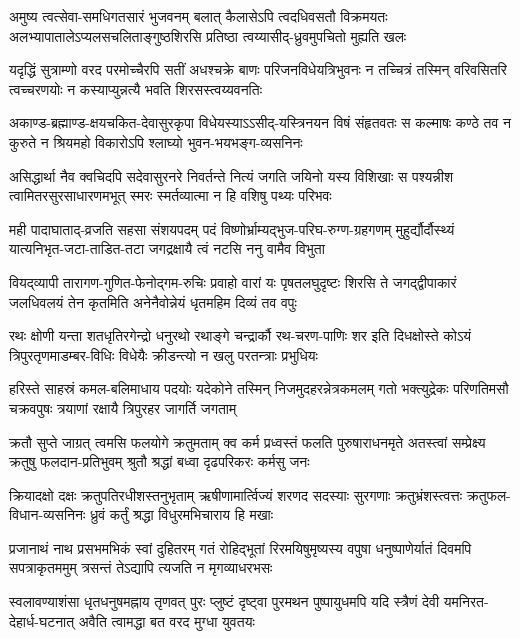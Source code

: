 \fourlineindentedshloka
{अमुष्य त्वत्सेवा-समधिगतसारं भुजवनम्}
{बलात् कैलासेऽपि त्वदधिवसतौ विक्रमयतः}
{अलभ्यापातालेऽप्यलसचलिताङ्गुष्ठशिरसि}
{प्रतिष्ठा त्वय्यासीद्-ध्रुवमुपचितो मुह्यति खलः}

\fourlineindentedshloka
{यदृद्धिं सुत्राम्णो वरद परमोच्चैरपि सतीं}
{अधश्चक्रे बाणः परिजनविधेयत्रिभुवनः}
{न तच्चित्रं तस्मिन् वरिवसितरि त्वच्चरणयोः}
{न कस्याप्युन्नत्यै भवति शिरसस्त्वय्यवनतिः}

\fourlineindentedshloka
{अकाण्ड-ब्रह्माण्ड-क्षयचकित-देवासुरकृपा}
{विधेयस्याऽऽसीद्-यस्त्रिनयन विषं संहृतवतः}
{स कल्माषः कण्ठे तव न कुरुते न श्रियमहो}
{विकारोऽपि श्लाघ्यो भुवन-भयभङ्ग-व्यसनिनः}

\fourlineindentedshloka
{असिद्धार्था नैव क्वचिदपि सदेवासुरनरे}
{निवर्तन्ते नित्यं जगति जयिनो यस्य विशिखाः}
{स पश्यन्नीश त्वामितरसुरसाधारणमभूत्}
{स्मरः स्मर्तव्यात्मा न हि वशिषु पथ्यः परिभवः}

\fourlineindentedshloka
{मही पादाघाताद्-व्रजति सहसा संशयपदम्}
{पदं विष्णोर्भ्राम्यद्भुज-परिघ-रुग्ण-ग्रहगणम्}
{मुहुर्द्यौर्दौस्थ्यं यात्यनिभृत-जटा-ताडित-तटा}
{जगद्रक्षायै त्वं नटसि ननु वामैव विभुता}

\fourlineindentedshloka
{वियद्‍व्यापी तारागण-गुणित-फेनोद्गम-रुचिः}
{प्रवाहो वारां यः पृषतलघुदृष्टः शिरसि ते}
{जगद्द्वीपाकारं जलधिवलयं तेन कृतमिति}
{अनेनैवोन्नेयं धृतमहिम दिव्यं तव वपुः}

\fourlineindentedshloka
{रथः क्षोणी यन्ता शतधृतिरगेन्द्रो धनुरथो}
{रथाङ्गे चन्द्रार्कौ रथ-चरण-पाणिः शर इति}
{दिधक्षोस्ते कोऽयं त्रिपुरतृणमाडम्बर-विधिः}
{विधेयैः क्रीडन्त्यो न खलु परतन्त्राः प्रभुधियः}

\fourlineindentedshloka
{हरिस्ते साहस्रं कमल-बलिमाधाय पदयोः}
{यदेकोने तस्मिन् निजमुदहरन्नेत्रकमलम्}
{गतो भक्त्युद्रेकः परिणतिमसौ चक्रवपुषः}
{त्रयाणां रक्षायै त्रिपुरहर  जागर्ति जगताम्}

\fourlineindentedshloka
{क्रतौ सुप्ते जाग्रत् त्वमसि फलयोगे क्रतुमताम्}
{क्व कर्म प्रध्वस्तं फलति पुरुषाराधनमृते}
{अतस्त्वां सम्प्रेक्ष्य क्रतुषु फलदान-प्रतिभुवम्}
{श्रुतौ श्रद्धां बध्वा दृढपरिकरः कर्मसु जनः}

\fourlineindentedshloka
{क्रियादक्षो दक्षः क्रतुपतिरधीशस्तनुभृताम्}
{ऋषीणामार्त्विज्यं शरणद सदस्याः सुरगणाः}
{क्रतुभ्रंशस्त्वत्तः क्रतुफल-विधान-व्यसनिनः}
{ध्रुवं कर्तुं श्रद्धा विधुरमभिचाराय हि मखाः}

\fourlineindentedshloka
{प्रजानाथं नाथ प्रसभमभिकं स्वां दुहितरम्}
{गतं रोहिद्भूतां रिरमयिषुमृष्यस्य वपुषा}
{धनुष्पाणेर्यातं दिवमपि सपत्राकृतममुम्}
{त्रसन्तं तेऽद्यापि त्यजति न मृगव्याधरभसः}

\fourlineindentedshloka
{स्वलावण्याशंसा धृतधनुषमह्नाय तृणवत्}
{पुरः प्लुष्टं दृष्ट्वा पुरमथन पुष्पायुधमपि}
{यदि स्त्रैणं देवी यमनिरत-देहार्ध-घटनात्}
{अवैति त्वामद्धा बत वरद मुग्धा युवतयः}

